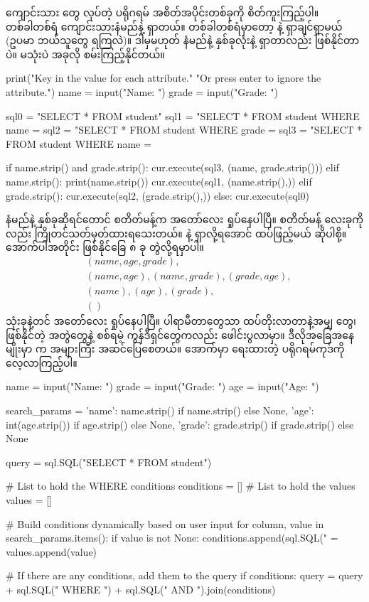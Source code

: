 ကျောင်းသား  တွေ  လုပ်တဲ့ ပရိုဂရမ် အစိတ်အပိုင်းတစ်ခုကို စိတ်ကူးကြည့်ပါ။ တစ်ခါတစ်ရံ ကျောင်းသားနံမည်နဲ့ ရှာတယ်။ တစ်ခါတစ်ရံမှာတော့  နဲ့ ရှာချင်ရှာမယ် (ဥပမာ ဘယ်သူတွေ  ရကြလဲ)။ ဒါမှမဟုတ် နံမည်နဲ့  နှစ်ခုလုံးနဲ့ ရှာတာလည်း ဖြစ်နိုင်တာပဲ။  မသုံးပဲ အခုလို စမ်းကြည့်နိုင်တယ်။
%
\begin{py}
print("Key in the value for each attribute."
      "Or press enter to ignore the attribute.")
name = input("Name: ")
grade = input("Grade: ")

sql0 = "SELECT * FROM student"
sql1 = "SELECT * FROM student WHERE name = %
sql2 = "SELECT * FROM student WHERE grade = %
sql3 = "SELECT * FROM student WHERE name = %

if name.strip() and grade.strip():
    cur.execute(sql3, (name, grade.strip()))
elif name.strip():
    print(name.strip())
    cur.execute(sql1, (name.strip(),))
elif grade.strip():
    cur.execute(sql2, (grade.strip(),))
else:
    cur.execute(sql0)
\end{py}
%
နံမည်နဲ့  နှစ်ခုဆိုရင်တောင်  စတိတ်မန့်က အတော်လေး ရှုပ်နေပါပြီ။  စတိတ်မန့် လေးခုကိုလည်း ကြိုတင်သတ်မှတ်ထားရသေးတယ်။  နဲ့ ရှာလို့ရအောင် ထပ်ဖြည့်မယ် ဆိုပါစို့။ အောက်ပါအတိုင်း ဖြစ်နိုင်ခြေ ၈ ခု တွဲလို့ရမှာပါ။
\begin{align*}
&(name, age, grade),\\
&(name, age), (name, grade), (grade, age),\\
&(name), (age), (grade),\\
&()    
\end{align*}
သုံးခုနဲ့တင် အတော်လေး ရှုပ်နေပါပြီ။ ပါရာမီတာတွေသာ ထပ်တိုးလာတာနဲ့အမျှ  တွေ၊ ဖြစ်နိုင်တဲ့ အတွဲတွေနဲ့ စစ်ရမဲ့ ကွန်ဒီရှင်တွေကလည်း ဖေါင်းပွလာမှာ။ ဒီလိုအခြေအနေမျိုးမှာ  က အများကြီး အဆင်ပြေစေတယ်။ အောက်မှာ ရေးထားတဲ့ ပရိုဂရမ်ကုဒ်ကို လေ့လာကြည့်ပါ။
%
\begin{py}
name = input("Name: ")
grade = input("Grade: ")
age = input("Age: ")

search_params = {
    'name': name.strip() if name.strip() else None,
    'age': int(age.strip()) if age.strip() else None,
    'grade': grade.strip() if grade.strip() else None
}

query = sql.SQL("SELECT * FROM student")

# List to hold the WHERE conditions
conditions = []
# List to hold the values
values = []

# Build conditions dynamically based on user input
for column, value in search_params.items():
    if value is not None:
        conditions.append(sql.SQL("{} = %
        values.append(value)

# If there are any conditions, add them to the query
if conditions:
    query = query + sql.SQL(" WHERE ") + sql.SQL(" AND ").join(conditions)
\end{py}
